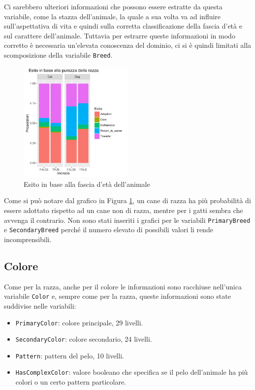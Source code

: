 Ci sarebbero ulteriori informazioni che possono essere estratte da questa variabile, come la stazza dell'animale, la quale a sua volta va ad influire sull'aspettativa di vita e quindi sulla corretta classificazione della fascia d'età e sul carattere dell'animale. Tuttavia per estrarre queste informazioni in modo corretto è necessaria un'elevata conoscenza del dominio, ci si è quindi limitati alla scomposizione della variabile \texttt{Breed}.

\begin{figure}[htbp]
	\centering
	\includegraphics[width=0.5\textwidth]{./grafici/esito_mix.pdf}
	\caption{Esito in base alla fascia d'età dell'animale}\label{fig-mix}
\end{figure}


Come si può notare dal grafico in Figura \ref{fig-mix}, un cane di razza ha più probabilità di essere adottato rispetto ad un cane non di razza, mentre per i gatti sembra che avvenga il contrario. Non sono stati inseriti i grafici per le variabili \texttt{PrimaryBreed} e \texttt{SecondaryBreed} perché il numero elevato di possibili valori li rende incomprensibili.

\subsection{Colore}

Come per la razza, anche per il colore le informazioni sono racchiuse nell'unica variabile \texttt{Color} e, sempre come per la razza, queste informazioni sono state suddivise nelle variabili:

\begin{itemize}
	\item \texttt{PrimaryColor}: colore principale, 29 livelli.
	\item \texttt{SecondaryColor}: colore secondario, 24 livelli.
	\item \texttt{Pattern}: pattern del pelo, 10 livelli.
	\item \texttt{HasComplexColor}: valore booleano che specifica se il pelo dell'animale ha più colori o un certo pattern particolare.
\end{itemize}

